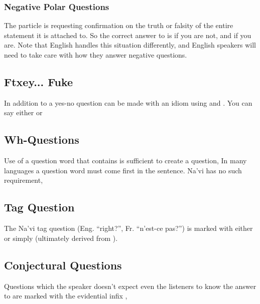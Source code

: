 \subsubsection{Negative Polar Questions} 
The particle  is requesting confirmation on the truth or
falsity of the entire statement it is attached to.  So the correct
answer to  
is  if you are not, and  if you are.  Note that
English handles this situation differently, and English speakers will
need to take care with how they answer negative questions.

\subsection{Ftxey... Fuke} In addition to  a yes-no
question can be made with an idiom using   and
 .  You can say either 
 or   
\label{syn:question:ftxey}

\subsection{Wh-Questions} Use of a question word that contains
 is sufficient to create a question,    In many languages a question word must come first
in the sentence.  Na'vi has no such requirement,  

\subsection{Tag Question}
The Na'vi tag question (Eng. ``right?'', Fr. ``n'est-ce pas?'') is
marked with either  or simply  (ultimately
derived from ).

\subsection{Conjectural Questions} Questions which the speaker
doesn't expect even the listeners to know the answer to are marked
with the evidential infix , 
  

